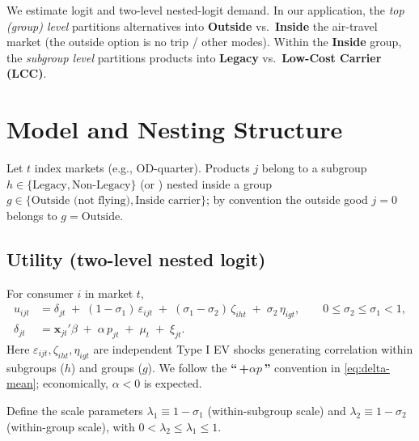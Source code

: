 \documentclass{article}
\begin{document}
We estimate logit and two-level nested-logit demand. In our application, the \emph{top (group) level} partitions alternatives into \textbf{Outside} vs.\ \textbf{Inside} the air-travel market (the outside option is no trip / other modes). Within the \textbf{Inside} group, the \emph{subgroup level} partitions products into \textbf{Legacy} vs.\ \textbf{Low-Cost Carrier (LCC)}.

\section{Model and Nesting Structure}
Let $t$ index markets (e.g., OD-quarter). Products $j$ belong to a subgroup $h\in\{ \text{Legacy},\text{Non-Legacy}\}$ (or ) nested inside a group $g\in\{\text{Outside (not flying)},\text{Inside carrier}\}$; by convention the outside good $j=0$ belongs to $g=\text{Outside}$.

\subsection*{Utility (two-level nested logit)}
For consumer $i$ in market $t$,
\begin{align}
u_{ijt}
&= \delta_{jt} \;+\; (1-\sigma_1)\,\varepsilon_{ijt} \;+\; (\sigma_1-\sigma_2)\,\zeta_{iht} \;+\; \sigma_2\,\eta_{igt}, 
\qquad 0 \le \sigma_2 \le \sigma_1 < 1, \label{eq:util-2lvl}\\
\delta_{jt}
&= \mathbf{x}_{jt}'\beta \;+\; \alpha\,p_{jt} \;+\; \mu_t \;+\; \xi_{jt}. \label{eq:delta-mean}
\end{align}
Here $\varepsilon_{ijt},\zeta_{iht},\eta_{igt}$ are independent Type I EV shocks generating correlation within subgroups ($h$) and groups ($g$). We follow the \textbf{“\,+$\alpha p$\,”} convention in \eqref{eq:delta-mean}; economically, $\alpha<0$ is expected.

Define the scale parameters $\lambda_1 \equiv 1-\sigma_1$ (within-subgroup scale) and $\lambda_2 \equiv 1-\sigma_2$ (within-group scale), with $0<\lambda_2\le\lambda_1\le 1$.

\end{document}
